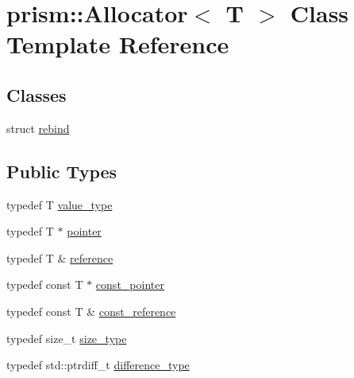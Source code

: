 \hypertarget{classprism_1_1_allocator}{}\section{prism\+:\+:Allocator$<$ T $>$ Class Template Reference}
\label{classprism_1_1_allocator}
\subsection*{Classes}
\begin{DoxyCompactItemize}
\item 
struct \hyperlink{structprism_1_1_allocator_1_1rebind}{rebind}
\end{DoxyCompactItemize}
\subsection*{Public Types}
\begin{DoxyCompactItemize}
\item 
typedef T \hyperlink{classprism_1_1_allocator_a45426ee64e0aba097a532e0ef5ff5700}{value\+\_\+type}
\item 
typedef T $\ast$ \hyperlink{classprism_1_1_allocator_ad3c6706a7243bd3ef489e16d34d5750f}{pointer}
\item 
typedef T \& \hyperlink{classprism_1_1_allocator_a5dde9876d2ed0ca292d8a2019ac2836f}{reference}
\item 
typedef const T $\ast$ \hyperlink{classprism_1_1_allocator_af6a4a91dfc203203ecc319a457ce4dce}{const\+\_\+pointer}
\item 
typedef const T \& \hyperlink{classprism_1_1_allocator_a89911899c97ae877a81b798957a2d899}{const\+\_\+reference}
\item 
typedef size\+\_\+t \hyperlink{classprism_1_1_allocator_a47cb9435e4e9ff4c934ea3d4b4338d52}{size\+\_\+type}
\item 
typedef std\+::ptrdiff\+\_\+t \hyperlink{classprism_1_1_allocator_a39ca38c4c741bbc51d3c6e26603102ef}{difference\+\_\+type}
\end{DoxyCompactItemize}
